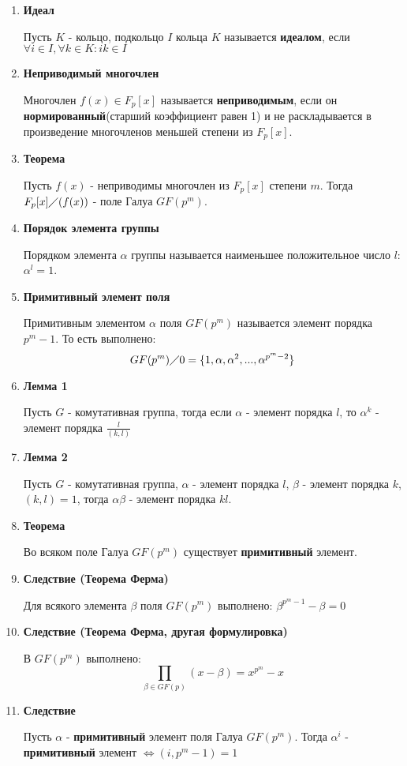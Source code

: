 \documentclass[a4paper, 12pt]{report}
\begin{document}
\begin{enumerate}
 
\item \textbf{Идеал}

Пусть $K$ - кольцо, подкольцо $I$ кольца $K$ называется \textbf{идеалом}, если $\forall i \in I, \forall k \in K:ik \in I$

\item \textbf{Неприводимый многочлен}

Многочлен $f(x)\in F_{p}[x]$ называется \textbf{неприводимым}, если он \textbf{нормированный}(старший коэффициент равен 1) и не раскладывается в произведение многочленов меньшей степени из $F_{p}[x]$.

\item \textbf{Теорема}

Пусть $f(x)$ - неприводимы многочлен из $F_{p}[x]$ степени $m$. Тогда $F_{p}[x]\diagup (f(x))$ - поле Галуа $GF(p^{m})$.

\item \textbf{Порядок элемента группы}

Порядком элемента $\alpha$ группы называется наименьшее положительное число $l$: $\alpha^{l} = 1$.

\item \textbf{Примитивный элемент поля}

Примитивным элементом $\alpha$ поля $GF(p^{m})$ называется элемент порядка $p^{m}-1$. То есть выполнено:
\[GF(p^{m})\diagup 0 = \lbrace 1, \alpha, \alpha^{2}, ..., \alpha^{p^{m}-2} \rbrace \]

\item \textbf{Лемма 1}

Пусть $G$ - комутативная группа, тогда если $\alpha$ - элемент порядка $l$, то $\alpha^{k}$ - элемент порядка $\frac{l}{(k,l)}$

\item \textbf{Лемма 2}

Пусть $G$ - комутативная группа, $\alpha$ - элемент порядка $l$, $\beta$ - элемент порядка $k$, $(k,l) = 1$, тогда $\alpha \beta$ - элемент порядка $kl$.

\item \textbf{Теорема}

Во всяком поле Галуа $GF(p^{m})$ существует \textbf{примитивный} элемент.

\item \textbf{Следствие (Теорема Ферма)}

Для всякого элемента $\beta$ поля $GF(p^{m})$ выполнено: $\beta^{p^{m}-1} - \beta = 0$

\item \textbf{Следствие (Теорема Ферма, другая формулировка)}

В $GF(p^{m})$ выполнено:
\[\prod_{\beta \in GF(p)}(x-\beta) = x^{p^{m}}-x\]

\item \textbf{Следствие}

Пусть $\alpha$ - \textbf{примитивный} элемент поля Галуа $GF(p^{m})$. Тогда $\alpha^{i}$ - \textbf{примитивный} элемент $\Leftrightarrow (i,p^{m}-1) = 1$ 

\end{enumerate}
\end{document}
